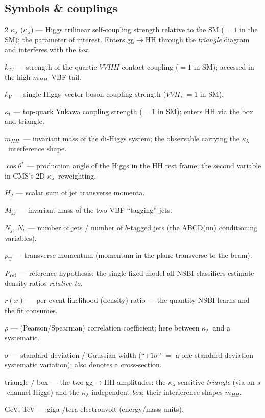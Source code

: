 \documentclass[11pt]{article}
\newcommand{\kl}{\ensuremath{\kappa_\lambda}}
\newcommand{\mhh}{\ensuremath{m_{HH}}}
\begin{document}
\subsection*{Symbols \& couplings}
{\footnotesize\setlength{\parindent}{0pt}\setlength{\parskip}{2.5pt}
\begin{multicols}{2}
$\kappa_\lambda$ (\kl) --- Higgs trilinear self-coupling strength relative to the SM ($=1$ in the SM); the
parameter of interest. Enters gg$\to$HH through the \emph{triangle} diagram and interferes with the \emph{box}.

$k_{2V}$ --- strength of the quartic $VVHH$ contact coupling ($=1$ in SM); accessed in the high-\mhh\ VBF tail.

$k_V$ --- single Higgs--vector-boson coupling strength ($VVH$, $=1$ in SM).

$\kappa_t$ --- top-quark Yukawa coupling strength ($=1$ in SM); enters HH via the box and triangle.

\mhh\ --- invariant mass of the di-Higgs system; the observable carrying the \kl\ interference shape.

$\cos\theta^*$ --- production angle of the Higgs in the HH rest frame; the second variable in CMS's 2D \kl\ reweighting.

$H_T$ --- scalar sum of jet transverse momenta.

$M_{jj}$ --- invariant mass of the two VBF ``tagging'' jets.

$N_j,\,N_b$ --- number of jets / number of $b$-tagged jets (the ABCD(nn) conditioning variables).

$p_{\mathrm T}$ --- transverse momentum (momentum in the plane transverse to the beam).

$P_{\rm ref}$ --- reference hypothesis: the single fixed model all NSBI classifiers estimate density ratios \emph{relative to}.

$r(x)$ --- per-event likelihood (density) ratio --- the quantity NSBI learns and the fit consumes.

$\rho$ --- (Pearson/Spearman) correlation coefficient; here between \kl\ and a systematic.

$\sigma$ --- standard deviation / Gaussian width (``$\pm1\sigma$'' $=$ a one-standard-deviation systematic variation); also denotes a cross-section.

triangle / box --- the two gg$\to$HH amplitudes: the \kl-sensitive \emph{triangle} (via an $s$-channel Higgs) and the \kl-independent \emph{box}; their interference shapes \mhh.

GeV, TeV --- giga-/tera-electronvolt (energy/mass units).
\end{multicols}}
\end{document}

